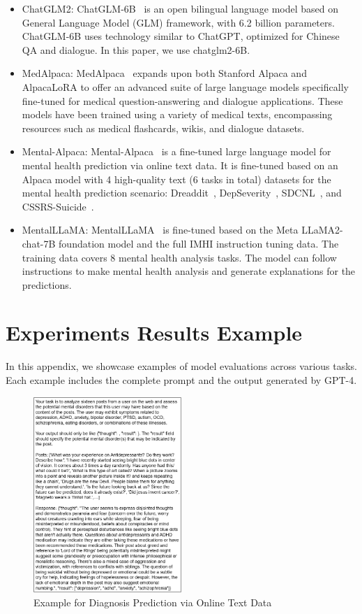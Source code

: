 \begin{itemize}
\item ChatGLM2: ChatGLM-6B~\cite{du2022glm, zeng2022glm} is an open bilingual language model based on General Language Model (GLM) framework, with 6.2 billion parameters. ChatGLM-6B uses technology similar to ChatGPT, optimized for Chinese QA and dialogue. In this paper, we use chatglm2-6B.
\item MedAlpaca: MedAlpaca~\cite{han2023medalpaca} expands upon both Stanford Alpaca and AlpacaLoRA to offer an advanced suite of large language models specifically fine-tuned for medical question-answering and dialogue applications. These models have been trained using a variety of medical texts, encompassing resources such as medical flashcards, wikis, and dialogue datasets.
\item Mental-Alpaca: Mental-Alpaca~\cite{xu2023leveraging} is a fine-tuned large language model for mental health prediction via online text data. It is fine-tuned based on an Alpaca model with 4 high-quality text (6 tasks in total) datasets for the mental health prediction scenario: Dreaddit~\cite{turcan-mckeown-2019-dreaddit}, DepSeverity~\cite{naseem2022early}, SDCNL~\cite{haque2021deep}, and CSSRS-Suicide~\cite{gaur2019knowledge}.
\item MentalLLaMA: MentalLLaMA~\cite{yang2023mentalllama} is fine-tuned based on the Meta LLaMA2-chat-7B foundation model and the full IMHI instruction tuning data. The training data covers 8 mental health analysis tasks. The model can follow instructions to make mental health analysis and generate explanations for the predictions.
\end{itemize}

\section{Experiments Results Example}
\label{app: result example}
In this appendix, we showcase examples of model evaluations across various tasks. Each example includes the complete prompt and the output generated by GPT-4.
\begin{figure}[ht]
    \centering
    \includegraphics[width=0.5\textwidth]{Figure/SMHD_example.png}
    \caption{Example for Diagnosis Prediction via Online Text Data}
\end{figure}

